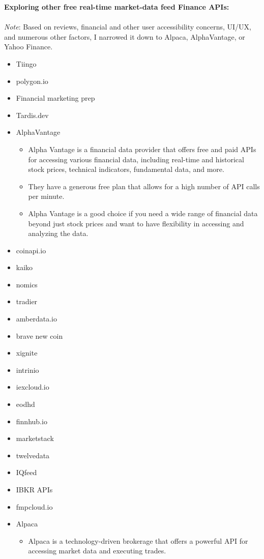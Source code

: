 \documentclass{assignment}
\begin{document}
\begin{problem}
\noindent\textbf{Exploring other free real-time market-data feed Finance APIs:} \\\\
\noindent \textit{Note}: Based on reviews, financial and other user accessibility concerns, UI/UX, and numerous other factors, I narrowed it down to Alpaca, AlphaVantage, or Yahoo Finance. \
\begin{itemize}
    \item Tiingo
    \item polygon.io
    \item Financial marketing prep
    \item Tardis.dev
    \item AlphaVantage
    \begin{itemize}
        \item Alpha Vantage is a financial data provider that offers free and paid APIs for accessing various financial data, including real-time and historical stock prices, technical indicators, fundamental data, and more. \
        \item They have a generous free plan that allows for a high number of API calls per minute. \
        \item Alpha Vantage is a good choice if you need a wide range of financial data beyond just stock prices and want to have flexibility in accessing and analyzing the data. \ 
    \end{itemize}
    \item coinapi.io
    \item kaiko
    \item nomics
    \item tradier
    \item amberdata.io
    \item brave new coin
    \item xignite
    \item intrinio
    \item iexcloud.io
    \item eodhd
    \item finnhub.io
    \item marketstack
    \item twelvedata
    \item IQfeed
    \item IBKR APIs
    \item fmpcloud.io
    \item Alpaca
    \begin{itemize}
        \item Alpaca is a technology-driven brokerage that offers a powerful API for accessing market data and executing trades. \

\end{itemize}
\end{itemize}
\end{problem}
\end{document}
